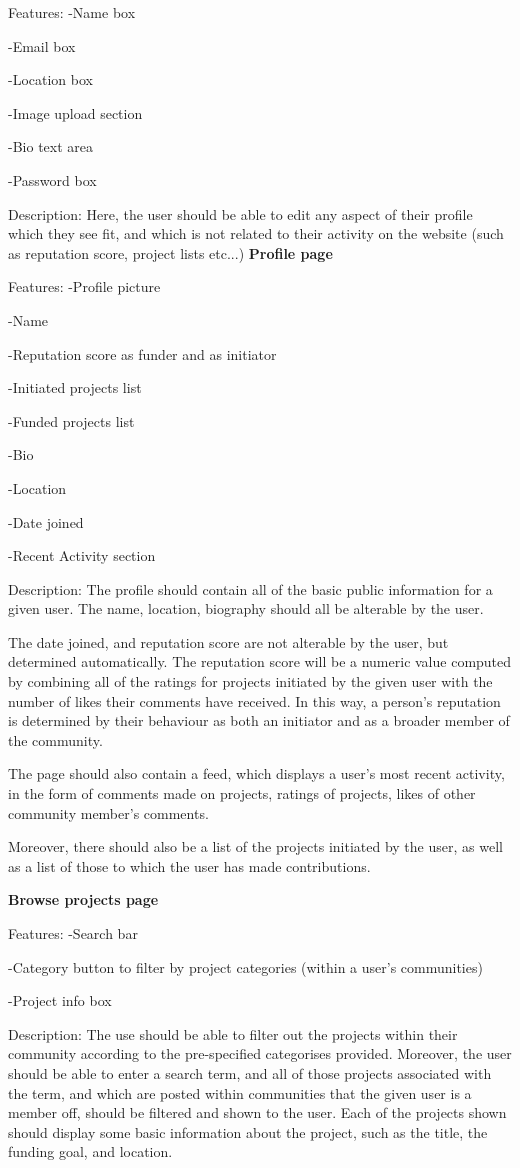 \documentclass[12pt]{article}
\begin{document}
\begin{enumerate}
Features:
-Name box

-Email box

-Location box

-Image upload section

-Bio text area

-Password box

Description:
Here, the user should be able to edit any aspect of their profile which they see fit, and which is not related to their activity
on the website (such as reputation score, project lists etc...)
\textbf{Profile page}

Features:
-Profile picture

-Name

-Reputation score as funder and as initiator

-Initiated projects list

-Funded projects list

-Bio

-Location

-Date joined

-Recent Activity section

Description:
The profile should contain all of the basic public information for a given user. The name, location, biography should all be
alterable by the user.

The date joined, and reputation score are not alterable by the user, but determined automatically.
The reputation score will be a numeric value computed by combining all of the ratings for projects initiated by the given user with 
the number of likes their comments have received. In this way, a person's reputation is determined by their behaviour as both an initiator
and as a broader member of the community.

The page should also contain a feed, which displays a user's most recent activity, in the form of comments made on projects, ratings of projects,
likes of other community member's comments.

Moreover, there should also be a list of the projects initiated by the user, as well as a list of those to which the user has made contributions.

\textbf{Browse projects page}

Features:
-Search bar

-Category button to filter by project categories (within a user's communities)

-Project info box

Description:
The use should be able to filter out the projects within their community according to the pre-specified categorises provided.
Moreover, the user should be able to enter a search term, and all of those projects associated with the term, 
and which are posted within communities
that the given user is a member off, should be filtered and shown to the user.
Each of the projects shown should display some basic information about the project, such as the title, the funding goal, and location.


\end{enumerate}
\end{document}
